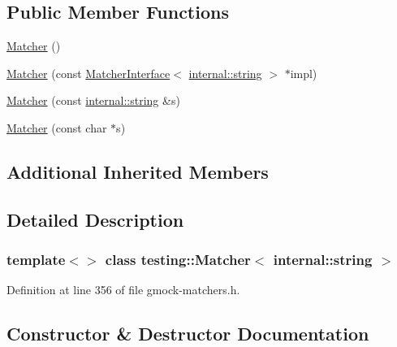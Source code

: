 \subsection*{Public Member Functions}
\begin{DoxyCompactItemize}
\item 
\hyperlink{classtesting_1_1Matcher_3_01internal_1_1string_01_4_ad0c4da71efc8f5b8a07f279fa2bcb392}{Matcher} ()
\item 
\hyperlink{classtesting_1_1Matcher_3_01internal_1_1string_01_4_a03a7b1b4a93b762685e2f46d6255d493}{Matcher} (const \hyperlink{classtesting_1_1MatcherInterface}{Matcher\+Interface}$<$ \hyperlink{namespacetesting_1_1internal_a8e8ff5b11e64078831112677156cb111}{internal\+::string} $>$ $\ast$impl)
\item 
\hyperlink{classtesting_1_1Matcher_3_01internal_1_1string_01_4_ae2d21038e4dcc25776187d8bff1665f3}{Matcher} (const \hyperlink{namespacetesting_1_1internal_a8e8ff5b11e64078831112677156cb111}{internal\+::string} \&s)
\item 
\hyperlink{classtesting_1_1Matcher_3_01internal_1_1string_01_4_a65f1d7616edb049ac059ad5d3fa2d625}{Matcher} (const char $\ast$s)
\end{DoxyCompactItemize}
\subsection*{Additional Inherited Members}


\subsection{Detailed Description}
\subsubsection*{template$<$$>$\newline
class testing\+::\+Matcher$<$ internal\+::string $>$}



Definition at line 356 of file gmock-\/matchers.\+h.



\subsection{Constructor \& Destructor Documentation}
\mbox{\label{classtesting_1_1Matcher_3_01internal_1_1string_01_4_ad0c4da71efc8f5b8a07f279fa2bcb392}} 
